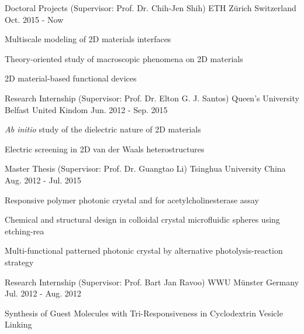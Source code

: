 

\begin{cventries}
\cventry
{Doctoral Projects (Supervisor: Prof. Dr. Chih-Jen Shih)} %
{ETH Z\"{u}rich} %
{Switzerland} %
{Oct. 2015 - Now} %
{
  \begin{cvitems}
  \item Multiscale modeling of 2D materials interfaces
  \item Theory-oriented study of macroscopic phenomena on 2D materials
  \item 2D material-based functional devices
  \end{cvitems}
}

\cventry
{Research Internship (Supervisor: Prof. Dr. Elton G. J. Santos)} %
{Queen's University Belfast} %
{United Kindom} %
{Jun. 2012 - Sep. 2015} %
{
  \begin{cvitems}
  \item \textit{Ab initio} study of the dielectric nature of 2D materials
  \item Electric screening in 2D van der Waals heterostructures
  \end{cvitems}
}

\cventry
{Master Thesis (Supervisor: Prof. Dr. Guangtao Li)}
{Tsinghua University}
{China}
{Aug. 2012 - Jul. 2015}
{
  \begin{cvitems}
  \item Responsive polymer photonic crystal and for acetylcholinesterase assay
  \item Chemical and structural design in colloidal crystal microfluidic spheres using etching-rea
  \item Multi-functional patterned photonic crystal by alternative photolysis-reaction strategy
  \end{cvitems}
}

\cventry
{Research Internship (Supervisor: Prof. Bart Jan Ravoo)} %
{WWU M\"{u}nster} %
{Germany} %
{Jul. 2012 - Aug. 2012} %
{
  \begin{cvitems}
  \item Synthesis of Guest Molecules with Tri-Responsiveness in Cyclodextrin Vesicle Linking
  \end{cvitems}
}


\end{cventries}
